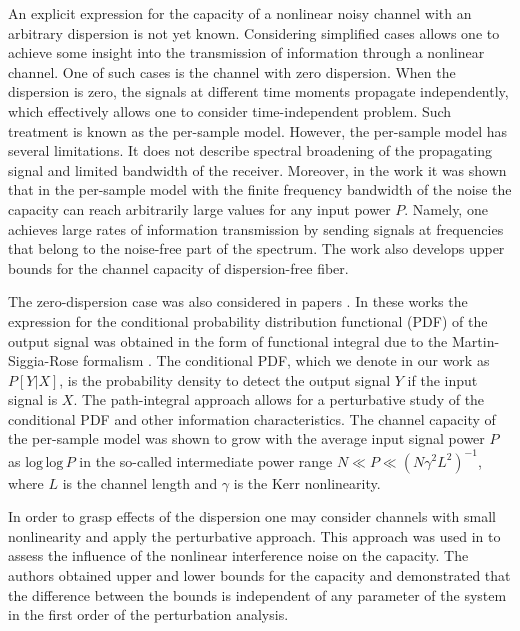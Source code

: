 \documentclass{article}
\begin{document}
An explicit expression for the capacity of a nonlinear noisy channel with an arbitrary dispersion is not yet known. Considering simplified cases allows one to achieve some insight into the transmission of information through a nonlinear channel. One of such cases is the channel with zero dispersion. When the dispersion is zero, the signals at different time moments propagate independently, which effectively allows one to consider time-independent problem. Such treatment is known as the per-sample model. However, the per-sample model has several limitations. It does not describe spectral broadening of the propagating signal and limited bandwidth of the receiver. Moreover, in the work \cite{kramer2018autocorrelation} it was shown that in the per-sample model with the finite frequency bandwidth of the noise the capacity can reach arbitrarily large values for any input power $P$. Namely, one achieves large rates of information transmission by sending signals at frequencies that belong to the noise-free part of the spectrum. The work \cite{kramer2018autocorrelation} also develops upper bounds for the channel capacity of dispersion-free fiber.

The zero-dispersion case was also considered in papers \cite{turitsyn2003information, terekhov2017log, panarin2017next, reznichenko2019log, reznichenko2022optimal}. In these works the expression for the conditional probability distribution functional (PDF) of the output signal was obtained in the form of functional integral due to the Martin-Siggia-Rose formalism \cite{zinn2021quantum, martin1973statistical}. The conditional PDF, which we denote in our work as $P[Y|X]$, is the probability density to detect the output signal $Y$ if the input signal is $X$. The path-integral approach allows for a perturbative study of the conditional PDF and other information characteristics. The channel capacity of the per-sample model was shown to grow with the average input signal power $P$ as $\textrm{log}\, \textrm{log} \,P$ in the so-called intermediate power range $N \ll P \ll (N\gamma^{2}L^{2})^{-1}$, where $L$ is the channel length and $\gamma$ is the Kerr nonlinearity.  

In order to grasp effects of the dispersion one may consider channels with small nonlinearity and apply the perturbative approach. This approach was used in \cite{shtaif2022challenges} to assess the influence of the nonlinear interference noise on the capacity. The authors obtained upper and lower bounds for the capacity and demonstrated that the difference between the bounds is independent of any parameter of the system in the first order of the perturbation analysis.
\end{document}
